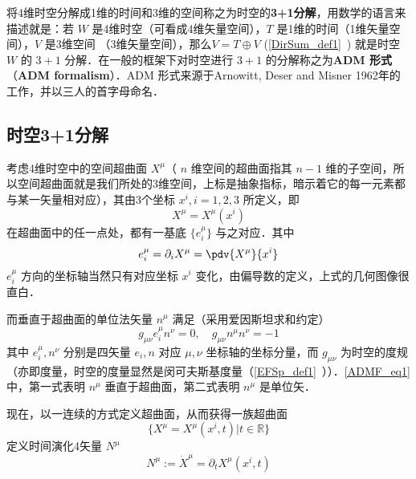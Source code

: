 \begin{issues}
\issueTODO
\end{issues}

将4维时空分解成1维的时间和3维的空间称之为时空的\textbf{3+1分解}，用数学的语言来描述就是：若 $W$ 是4维时空（可看成4维矢量空间），$T$ 是1维的时间（1维矢量空间），$V$ 是3维空间 （3维矢量空间），那么$V=T\oplus V$ (\autoref{DirSum_def1}~) 就是时空 $W$ 的 $3+1$ 分解．在一般的框架下对时空进行 $3+1$ 的分解称之为\textbf{ADM 形式}（\textbf{ADM formalism}）．ADM 形式来源于Arnowitt, Deser and Misner 1962年的工作，并以三人的首字母命名．
\subsection{时空3+1分解}
考虑4维时空中的空间超曲面 $X^\mu$（ $n$ 维空间的超曲面指其 $n-1$ 维的子空间，所以空间超曲面就是我们所处的3维空间，上标是抽象指标，暗示着它的每一元素都与某一矢量相对应），其由3个坐标 $x^i,i=1,2,3$ 所定义，即 
\begin{equation}
X^\mu=X^\mu(x^i)
\end{equation}
在超曲面中的任一点处，都有一基底 $\{e^\mu_i\}$ 与之对应．其中
\begin{equation}
e^\mu_i=\partial_i  X^\mu=\pdv{ X^\mu}{x^i}
\end{equation}
$e^\mu_i$ 方向的坐标轴当然只有对应坐标 $x^i$ 变化，由偏导数的定义，上式的几何图像很直白．

而垂直于超曲面的单位法矢量 $n^\mu$ 满足（采用爱因斯坦求和约定）
\begin{equation}\label{ADMF_eq1}
g_{\mu\nu} e_i^\mu n^\nu=0,\quad g_{\mu\nu}n^\mu n^\nu=-1
\end{equation}
其中 $e_i^\mu,n^\nu$ 分别是四矢量 $ e_i,n$ 对应 $\mu,\nu$ 坐标轴的坐标分量，而 $g_{\mu\nu}$ 为时空的度规（亦即度量，时空的度量显然是闵可夫斯基度量（\autoref{EFSp_def1}~））．\autoref{ADMF_eq1} 中，第一式表明 $n^\mu$ 垂直于超曲面，第二式表明 $n^\mu$ 是单位矢．

现在，以一连续的方式定义超曲面，从而获得一族超曲面 
\begin{equation}
\{{X^\mu}= X^\mu(x^i,t)|t\in\mathbb R\}
\end{equation}
定义时间演化4矢量 $N^\mu$
\begin{equation}
N^\mu:=\dot{X}^\mu=\partial_t  X^\mu(x^i,t)
\end{equation}

